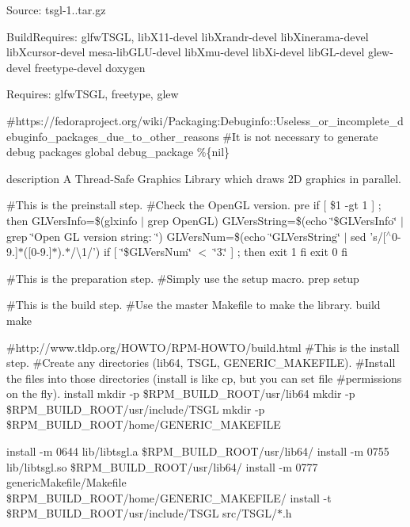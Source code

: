 Source\-: tsgl-\/1..\-tar.\-gz

Build\-Requires\-: glfw\-T\-S\-G\-L, lib\-X11-\/devel lib\-Xrandr-\/devel lib\-Xinerama-\/devel lib\-Xcursor-\/devel mesa-\/lib\-G\-L\-U-\/devel lib\-Xmu-\/devel lib\-Xi-\/devel lib\-G\-L-\/devel glew-\/devel freetype-\/devel doxygen

Requires\-: glfw\-T\-S\-G\-L, freetype, glew

\#https\-://fedoraproject.org/wiki/\-Packaging\-:Debuginfo\-::\-Useless\-\_\-or\-\_\-incomplete\-\_\-debuginfo\-\_\-packages\-\_\-due\-\_\-to\-\_\-other\-\_\-reasons \#\-It is not necessary to generate debug packages global debug\-\_\-package \%\{nil\}

description A Thread-\/\-Safe Graphics Library which draws 2\-D graphics in parallel.

\#\-This is the preinstall step. \#\-Check the Open\-G\-L version. pre if \mbox{[} \$1 -\/gt 1 \mbox{]} ; then G\-L\-Vers\-Info=\$(glxinfo $\vert$ grep Open\-G\-L) G\-L\-Vers\-String=\$(echo \char`\"{}\$\-G\-L\-Vers\-Info\char`\"{} $\vert$ grep \char`\"{}\-Open G\-L version string\-: \char`\"{}) G\-L\-Vers\-Num=\$(echo \char`\"{}\-G\-L\-Vers\-String\char`\"{} $\vert$ sed 's/\mbox{[}$^\wedge$0-\/9.\mbox{]}$\ast$(\mbox{[}0-\/9.\mbox{]}$\ast$).$\ast$/\textbackslash{}1/') if \mbox{[} \char`\"{}\$\-G\-L\-Vers\-Num\char`\"{} $<$ \char`\"{}3.\char`\"{} \mbox{]} ; then exit 1 fi exit 0 fi

\#\-This is the preparation step. \#\-Simply use the setup macro. prep setup

\#\-This is the build step. \#\-Use the master Makefile to make the library. build make

\#http\-://www.tldp.\-org/\-H\-O\-W\-T\-O/\-R\-P\-M-\/\-H\-O\-W\-T\-O/build.html \#\-This is the install step. \#\-Create any directories (lib64, T\-S\-G\-L, G\-E\-N\-E\-R\-I\-C\-\_\-\-M\-A\-K\-E\-F\-I\-L\-E). \#\-Install the files into those directories (install is like cp, but you can set file \#permissions on the fly). install mkdir -\/p \$\-R\-P\-M\-\_\-\-B\-U\-I\-L\-D\-\_\-\-R\-O\-O\-T/usr/lib64 mkdir -\/p \$\-R\-P\-M\-\_\-\-B\-U\-I\-L\-D\-\_\-\-R\-O\-O\-T/usr/include/\-T\-S\-G\-L mkdir -\/p \$\-R\-P\-M\-\_\-\-B\-U\-I\-L\-D\-\_\-\-R\-O\-O\-T/home/\-G\-E\-N\-E\-R\-I\-C\-\_\-\-M\-A\-K\-E\-F\-I\-L\-E

install -\/m 0644 lib/libtsgl.\-a \$\-R\-P\-M\-\_\-\-B\-U\-I\-L\-D\-\_\-\-R\-O\-O\-T/usr/lib64/ install -\/m 0755 lib/libtsgl.\-so \$\-R\-P\-M\-\_\-\-B\-U\-I\-L\-D\-\_\-\-R\-O\-O\-T/usr/lib64/ install -\/m 0777 generic\-Makefile/\-Makefile \$\-R\-P\-M\-\_\-\-B\-U\-I\-L\-D\-\_\-\-R\-O\-O\-T/home/\-G\-E\-N\-E\-R\-I\-C\-\_\-\-M\-A\-K\-E\-F\-I\-L\-E/ install -\/t \$\-R\-P\-M\-\_\-\-B\-U\-I\-L\-D\-\_\-\-R\-O\-O\-T/usr/include/\-T\-S\-G\-L src/\-T\-S\-G\-L/$\ast$.h

